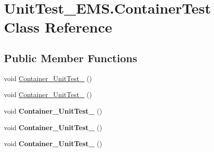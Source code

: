 \hypertarget{class_unit_test___e_m_s_1_1_container_test}{\section{Unit\-Test\-\_\-\-E\-M\-S.\-Container\-Test Class Reference}
\label{class_unit_test___e_m_s_1_1_container_test}
}
\subsection*{Public Member Functions}
\begin{DoxyCompactItemize}
\item 
void \hyperlink{class_unit_test___e_m_s_1_1_container_test_a5fe1987040a311581e02927e14b7a13c}{Container\-\_\-\-Unit\-Test\-\_} ()
\item 
void \hyperlink{class_unit_test___e_m_s_1_1_container_test_adf6fa4038f7a3d1c80fde256276332cd}{Container\-\_\-\-Unit\-Test\-\_} ()
\item 
\hypertarget{class_unit_test___e_m_s_1_1_container_test_ab575ad3e11546c0b21c51d42ca1338bc}{void {\bfseries Container\-\_\-\-Unit\-Test\-\_} ()}\label{class_unit_test___e_m_s_1_1_container_test_ab575ad3e11546c0b21c51d42ca1338bc}

\item 
\hypertarget{class_unit_test___e_m_s_1_1_container_test_a7f8edf27244fe454f31ddb4325aa3fe5}{void {\bfseries Container\-\_\-\-Unit\-Test\-\_} ()}\label{class_unit_test___e_m_s_1_1_container_test_a7f8edf27244fe454f31ddb4325aa3fe5}

\item 
\hypertarget{class_unit_test___e_m_s_1_1_container_test_a154024d3270a6b61600f52e0ce6a81e9}{void {\bfseries Container\-\_\-\-Unit\-Test\-\_} ()}\label{class_unit_test___e_m_s_1_1_container_test_a154024d3270a6b61600f52e0ce6a81e9}

\end{DoxyCompactItemize}


